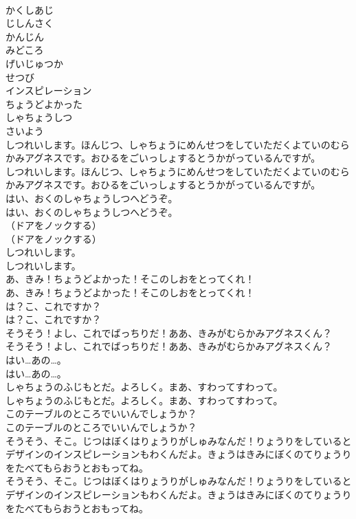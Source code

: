 \documentclass[8pt]{extreport}
\begin{document}
\begin{CJK}{UTF8}{min}
\\	かくしあじ
\\	じしんさく
\\	かんじん
\\	みどころ
\\	げいじゅつか
\\	せつび
\\	インスピレーション
\\	ちょうどよかった
\\	しゃちょうしつ
\\	さいよう
\\	しつれいします。ほんじつ、しゃちょうにめんせつをしていただくよていのむらかみアグネスです。おひるをごいっしょするとうかがっているんですが。	
\\	しつれいします。ほんじつ、しゃちょうにめんせつをしていただくよていのむらかみアグネスです。おひるをごいっしょするとうかがっているんですが。 
\\	はい、おくのしゃちょうしつへどうぞ。	
\\	はい、おくのしゃちょうしつへどうぞ。 
\\	（ドアをノックする）	
\\	（ドアをノックする） 
\\	しつれいします。	
\\	しつれいします。 
\\	あ、きみ！ちょうどよかった！そこのしおをとってくれ！	
\\	あ、きみ！ちょうどよかった！そこのしおをとってくれ！ 
\\	は？こ、これですか？	
\\	は？こ、これですか？ 
\\	そうそう！よし、これでばっちりだ！ああ、きみがむらかみアグネスくん？	
\\	そうそう！よし、これでばっちりだ！ああ、きみがむらかみアグネスくん？ 
\\	はい…あの…。	
\\	はい…あの…。 
\\	しゃちょうのふじもとだ。よろしく。まあ、すわってすわって。	
\\	しゃちょうのふじもとだ。よろしく。まあ、すわってすわって。 
\\	このテーブルのところでいいんでしょうか？	
\\	このテーブルのところでいいんでしょうか？ 
\\	そうそう、そこ。じつはぼくはりょうりがしゅみなんだ！りょうりをしているとデザインのインスピレーションもわくんだよ。きょうはきみにぼくのてりょうりをたべてもらおうとおもってね。	
\\	そうそう、そこ。じつはぼくはりょうりがしゅみなんだ！りょうりをしているとデザインのインスピレーションもわくんだよ。きょうはきみにぼくのてりょうりをたべてもらおうとおもってね。 

\end{CJK}
\end{document}
